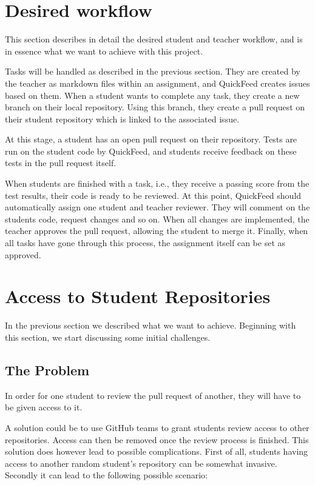\section{Desired workflow}

This section describes in detail the desired student and teacher workflow, and is in essence what we want to achieve with this project.

Tasks will be handled as described in the previous section.
They are created by the teacher as markdown files within an assignment, and QuickFeed creates issues based on them.
When a student wants to complete any task, they create a new branch on their local repository.
Using this branch, they create a pull request on their student repository which is linked to the associated issue.

At this stage, a student has an open pull request on their repository.
Tests are run on the student code by QuickFeed, and students receive feedback on these tests in the pull request itself.

When students are finished with a task, i.e., they receive a passing score from the test results, their code is ready to be reviewed.
At this point, QuickFeed should automatically assign one student and teacher reviewer.
They will comment on the students code, request changes and so on.
When all changes are implemented, the teacher approves the pull request, allowing the student to merge it.
Finally, when all tasks have gone through this process, the assignment itself can be set as approved.

\section{Access to Student Repositories}

In the previous section we described what we want to achieve.
Beginning with this section, we start discussing some initial challenges.

\subsection{The Problem}

In order for one student to review the pull request of another, they will have to be given access to it.

A solution could be to use GitHub teams to grant students review access to other repositories.
Access can then be removed once the review process is finished.
This solution does however lead to possible complications.
First of all, students having access to another random student's repository can be somewhat invasive.
Secondly it can lead to the following possible scenario:

